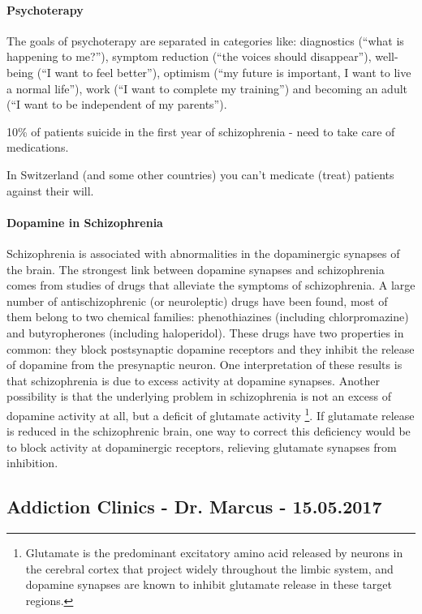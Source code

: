 \documentclass[12pt,article,oneside,a4paper]{memoir}
\begin{document}
\paragraph{Psychoterapy}
The goals of psychoterapy are separated in categories like: diagnostics (``what
is happening to me?''), symptom reduction (``the voices should disappear''),
well-being (``I want to feel better''), optimism (``my future is important, I
want to live a normal life''), work (``I want to complete my training'') and
becoming an adult (``I want to be independent of my parents'').

10\% of patients suicide in the first year of schizophrenia - need to take care
of medications.

In Switzerland (and some other countries) you can't medicate (treat) patients
against their will.

\paragraph{Dopamine in Schizophrenia}
Schizophrenia is associated with abnormalities in the dopaminergic synapses of
the brain. The strongest link between dopamine synapses and schizophrenia comes
from studies of drugs that alleviate the symptoms of schizophrenia.
A large number of antischizophrenic (or neuroleptic) drugs have been found,
most of them belong to two chemical families: phenothiazines (including
chlorpromazine) and butyropherones (including haloperidol). These drugs have
two properties in common: they block postsynaptic dopamine receptors and they
inhibit the release of dopamine from the presynaptic neuron. One interpretation
of these results is that schizophrenia is due to excess activity at dopamine
synapses. Another possibility is that the underlying problem in schizophrenia
is not an excess of dopamine activity at all, but a deficit of glutamate
activity \footnote{Glutamate is the predominant excitatory amino acid released
by neurons in the cerebral cortex that project widely throughout the limbic
system, and dopamine synapses are known to inhibit glutamate release in these
target regions.}.
If glutamate release is reduced in the schizophrenic brain, one way to correct
this deficiency would be to block activity at dopaminergic receptors, relieving
glutamate synapses from inhibition.

\newpage
\subsection{Addiction Clinics - Dr. Marcus - 15.05.2017}
\end{document}
